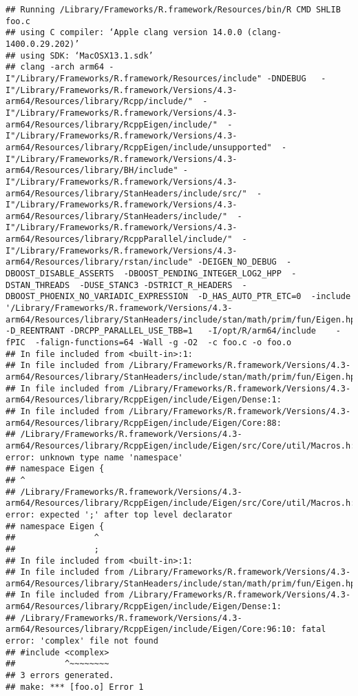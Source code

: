 \documentclass[
]{article}
\begin{document}
\begin{verbatim}
## Running /Library/Frameworks/R.framework/Resources/bin/R CMD SHLIB foo.c
## using C compiler: ‘Apple clang version 14.0.0 (clang-1400.0.29.202)’
## using SDK: ‘MacOSX13.1.sdk’
## clang -arch arm64 -I"/Library/Frameworks/R.framework/Resources/include" -DNDEBUG   -I"/Library/Frameworks/R.framework/Versions/4.3-arm64/Resources/library/Rcpp/include/"  -I"/Library/Frameworks/R.framework/Versions/4.3-arm64/Resources/library/RcppEigen/include/"  -I"/Library/Frameworks/R.framework/Versions/4.3-arm64/Resources/library/RcppEigen/include/unsupported"  -I"/Library/Frameworks/R.framework/Versions/4.3-arm64/Resources/library/BH/include" -I"/Library/Frameworks/R.framework/Versions/4.3-arm64/Resources/library/StanHeaders/include/src/"  -I"/Library/Frameworks/R.framework/Versions/4.3-arm64/Resources/library/StanHeaders/include/"  -I"/Library/Frameworks/R.framework/Versions/4.3-arm64/Resources/library/RcppParallel/include/"  -I"/Library/Frameworks/R.framework/Versions/4.3-arm64/Resources/library/rstan/include" -DEIGEN_NO_DEBUG  -DBOOST_DISABLE_ASSERTS  -DBOOST_PENDING_INTEGER_LOG2_HPP  -DSTAN_THREADS  -DUSE_STANC3 -DSTRICT_R_HEADERS  -DBOOST_PHOENIX_NO_VARIADIC_EXPRESSION  -D_HAS_AUTO_PTR_ETC=0  -include '/Library/Frameworks/R.framework/Versions/4.3-arm64/Resources/library/StanHeaders/include/stan/math/prim/fun/Eigen.hpp'  -D_REENTRANT -DRCPP_PARALLEL_USE_TBB=1   -I/opt/R/arm64/include    -fPIC  -falign-functions=64 -Wall -g -O2  -c foo.c -o foo.o
## In file included from <built-in>:1:
## In file included from /Library/Frameworks/R.framework/Versions/4.3-arm64/Resources/library/StanHeaders/include/stan/math/prim/fun/Eigen.hpp:22:
## In file included from /Library/Frameworks/R.framework/Versions/4.3-arm64/Resources/library/RcppEigen/include/Eigen/Dense:1:
## In file included from /Library/Frameworks/R.framework/Versions/4.3-arm64/Resources/library/RcppEigen/include/Eigen/Core:88:
## /Library/Frameworks/R.framework/Versions/4.3-arm64/Resources/library/RcppEigen/include/Eigen/src/Core/util/Macros.h:628:1: error: unknown type name 'namespace'
## namespace Eigen {
## ^
## /Library/Frameworks/R.framework/Versions/4.3-arm64/Resources/library/RcppEigen/include/Eigen/src/Core/util/Macros.h:628:16: error: expected ';' after top level declarator
## namespace Eigen {
##                ^
##                ;
## In file included from <built-in>:1:
## In file included from /Library/Frameworks/R.framework/Versions/4.3-arm64/Resources/library/StanHeaders/include/stan/math/prim/fun/Eigen.hpp:22:
## In file included from /Library/Frameworks/R.framework/Versions/4.3-arm64/Resources/library/RcppEigen/include/Eigen/Dense:1:
## /Library/Frameworks/R.framework/Versions/4.3-arm64/Resources/library/RcppEigen/include/Eigen/Core:96:10: fatal error: 'complex' file not found
## #include <complex>
##          ^~~~~~~~~
## 3 errors generated.
## make: *** [foo.o] Error 1
\end{verbatim}
\end{document}
